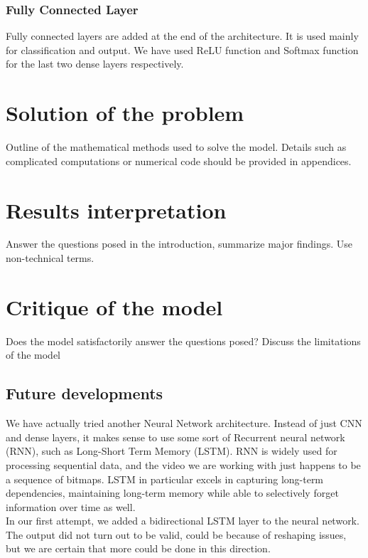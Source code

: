 \documentclass[11pt,a4paper]{scrartcl}
\begin{document}
\subsubsection{Fully Connected Layer}
Fully connected layers are added at the end of the architecture. It is used mainly for classification and output. We have used ReLU function and Softmax function for the last two dense layers respectively.


\section{Solution of the problem}
Outline of the mathematical methods used to solve the model. Details such as complicated computations or numerical code should be provided in appendices.


\section{Results interpretation}
Answer the questions posed in the introduction, summarize major findings. Use non-technical terms.


\section{Critique of the model}

Does the model satisfactorily answer the questions posed? Discuss the limitations of the model

\subsection{Future developments}
We have actually tried another Neural Network architecture. Instead of just CNN and dense layers, it makes sense to use some sort of Recurrent neural network (RNN), such as Long-Short Term Memory (LSTM). RNN is widely used for processing sequential data, and the video we are working with just happens to be a sequence of bitmaps. LSTM in particular excels in capturing long-term dependencies, maintaining long-term memory while able to selectively forget information over time as well.\\

In our first attempt, we added a bidirectional LSTM layer to the neural network. The output did not turn out to be valid, could be because of reshaping issues, but we are certain that more could be done in this direction.
\end{document}
